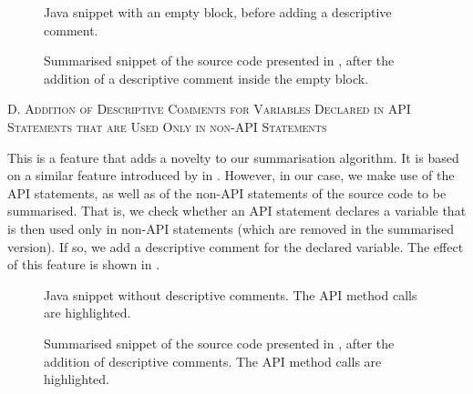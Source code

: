 \begin{figure}[h]

\vspace{-10pt}
\caption[Java snippet, with an empty block]{Java snippet with an empty block, before adding a descriptive comment.}
\label{listings:empty-block-org}
\end{figure}

\vspace{-20pt}

\begin{figure}[!h]

\vspace{-10pt}
\caption[Summarised snippet, with a descriptive comment inside the empty\protect\\block]{Summarised snippet of the source code presented in , after the addition of a descriptive comment inside the empty block.}
\label{listings:empty-block-sum}
\end{figure}

\clearpage

\noindent
\textsc{D. Addition of Descriptive Comments for Variables Declared in API Statements that are Used Only in non-API Statements}
\vspace{5pt}

This is a feature that adds a novelty to our summarisation algorithm. It is based on a similar feature introduced by  in \cite{Buse:2012}. However, in our case, we make use of the API statements, as well as of the non-API statements of the source code to be summarised. That is, we check whether an API statement declares a variable that is then used only in non-API statements (which are removed in the summarised version). If so, we add a descriptive comment for the declared variable. The effect of this feature is shown in .

\begin{figure}[h]

\vspace{-10pt}
\caption[Java snippet without descriptive comments]{Java snippet without descriptive comments. The API method calls are highlighted.}
\label{listings:forward-comment-org}
\end{figure}

\vspace{-20pt}

\begin{figure}[h]

\vspace{-10pt}
\caption[Summarised snippet with descriptive comments]{Summarised snippet of the source code presented in , after the addition of descriptive comments. The API method calls are highlighted.}
\label{listings:forward-comment-sum}
\end{figure}


